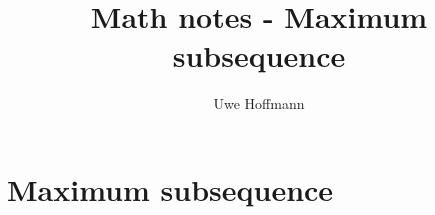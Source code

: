 

\title{Math notes - Maximum subsequence}
\author{Uwe Hoffmann}



\setcounter{chapter}{1}
\chapter*{Maximum subsequence}
